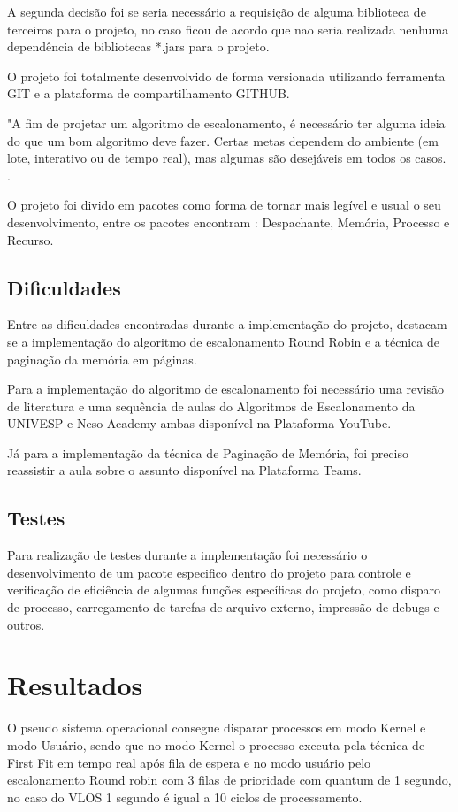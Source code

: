 \documentclass[article,12pt,oneside,a4paper,english,brazil,sumario=tradicional]{abntex2}
\begin{document}
A segunda decisão foi se seria necessário a requisição de alguma biblioteca de terceiros para o projeto, no caso ficou de acordo que nao seria realizada nenhuma dependência de bibliotecas *.jars para o projeto.

O projeto foi totalmente desenvolvido de forma versionada utilizando ferramenta GIT e a plataforma de compartilhamento GITHUB.
 
\vspace{24pt} %
\begin{citacao}
"A fim de projetar um algoritmo de escalonamento, é necessário ter alguma ideia do que um bom algoritmo deve fazer. Certas metas dependem do ambiente (em lote, interativo ou de tempo real), mas algumas são desejáveis em todos os casos. \cite[p.~106]{tanebaum2010}. 
\end{citacao}
\vspace{24pt} %

O projeto foi divido em pacotes como forma de tornar mais legível e usual o seu desenvolvimento, entre os pacotes encontram : Despachante, Memória, Processo e Recurso.

 
\subsection{Dificuldades}
Entre as dificuldades encontradas durante a implementação do projeto, destacam-se a implementação do algoritmo de escalonamento Round Robin e a técnica de paginação da memória em páginas.

Para a implementação do algoritmo de escalonamento foi necessário uma revisão de literatura e uma sequência de aulas do Algoritmos de Escalonamento da UNIVESP e Neso Academy ambas disponível na Plataforma YouTube.

Já para a implementação da técnica de Paginação de Memória, foi preciso reassistir a aula sobre o assunto disponível na Plataforma Teams.


\subsection{Testes}
Para realização de testes durante a implementação foi necessário o desenvolvimento de um pacote especifico dentro do projeto para controle e verificação de eficiência de algumas funções específicas do projeto, como disparo de processo, carregamento de tarefas de arquivo externo, impressão de debugs  e outros.


\section{Resultados}
O pseudo sistema operacional consegue disparar processos em modo Kernel e modo Usuário, sendo que no modo Kernel o processo executa pela técnica de First Fit em tempo real após fila de espera e no modo usuário pelo escalonamento Round robin com 3 filas de prioridade com quantum de 1 segundo, no caso do VLOS 1 segundo é igual a 10 ciclos de processamento.
\end{document}
